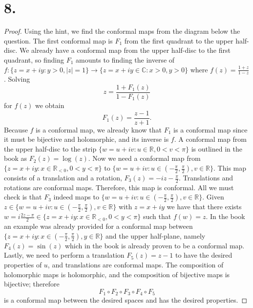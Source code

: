 \documentclass{article}
\begin{document}
\section*{8.}
\begin{proof}
  Using the hint, we find the conformal maps from the diagram below the question. The first conformal map is $F_1$ from the first quadrant to the upper half-disc. We already have a conformal map from the upper half-disc to the first quadrant, so finding $F_1$ amounts to finding the inverse of $f:\{z = x + iy: y > 0, |z| = 1\} \to \{z = x + iy \in \mathbb{C} : x > 0, y > 0\}$ where $f(z) = \frac{1 + z}{1 - z}$. Solving 
  \[
  z = \frac{1 + F_1(z)}{1 - F_1(z)}  
  \]
  for $f(z)$ we obtain 
  \[
  F_1(z) = \frac{z - 1}{z + 1}. 
  \]
  Because $f$ is a conformal map, we already know that $F_1$ is a conformal map since it must be bijective and holomorphic, and its inverse is $f$. A conformal map from the upper half-disc to the strip $\{w  = u + iv: u \in \mathbb{R}, 0 < v < \pi \}$ is outlined in the book as $F_2(z) = \log(z)$. Now we need a conformal map from $\{z = x + iy : x \in \mathbb{R}_{< 0}, 0 < y < \pi\}$ to $\{w = u + iv : u \in \left(-\frac{\pi}{2}, \frac{\pi}{2}\right), v \in \mathbb{R} \}$. This map consists of a translation and a rotation, $F_3(z) = -iz - \frac{\pi}{2}$. Translations and rotations are conformal maps. Therefore, this map is conformal. All we must check is that $F_3$ indeed maps to $\{w = u + iv : u \in \left(-\frac{\pi}{2}, \frac{\pi}{2}\right), v \in \mathbb{R} \}$. Given $z \in \{w = u + iv : u \in \left(-\frac{\pi}{2}, \frac{\pi}{2}\right), v \in \mathbb{R} \}$ with $z = x+iy$ we have that there exists $w = i\frac{2z - \pi}{2} \in \{z = x + iy : x \in \mathbb{R}_{<0}, 0 < y < \pi\}$ such that $f(w) = z$. In the book an example was already provided for a conformal map between $\{z = x + iy: x \in \left(-\frac{\pi}{2}, \frac{\pi}{2}\right), y \in \mathbb{R}\}$ and the upper half-plane, namely $F_4(z) = \sin(z)$ which in the book is already proven to be a conformal map. Lastly, we need to perform a translation $F_5(z) = z - 1$ to have the desired properties of $u$, and translations are conformal maps. The composition of holomorphic maps is holomorphic, and the composition of bijective maps is bijective; therefore 
  \[
  F_1 \circ F_2 \circ F_3 \circ F_4 \circ F_5  
\]
is a conformal map between the desired spaces and has the desired properties. 
\end{proof}
\end{document}

